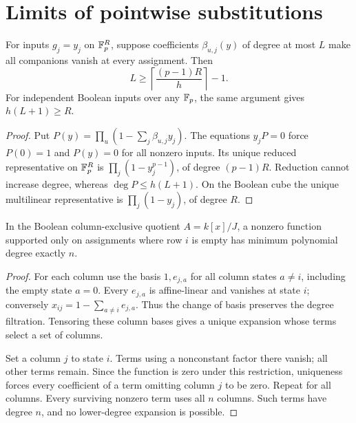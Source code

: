 \section{Limits of pointwise substitutions}
\begin{lemma}\label{lem:pointwisebarrier}
For inputs $g_j=y_j$ on $\mathbb F_p^R$, suppose coefficients $\beta_{u,j}(y)$ of degree at most $L$ make all companions vanish at every assignment. Then
\[
 \boxed{L\ge\left\lceil\frac{(p-1)R}{h}\right\rceil-1.}
\]
For independent Boolean inputs over any $\mathbb F_p$, the same argument gives $h(L+1)\ge R$.
\end{lemma}
\begin{proof}
Put $P(y)=\prod_u(1-\sum_j\beta_{u,j}y_j)$. The equations $y_jP=0$ force $P(0)=1$ and $P(y)=0$ for all nonzero inputs. Its unique reduced representative on $\mathbb F_p^R$ is $\prod_j(1-y_j^{p-1})$, of degree $(p-1)R$. Reduction cannot increase degree, whereas $\deg P\le h(L+1)$. On the Boolean cube the unique multilinear representative is $\prod_j(1-y_j)$, of degree $R$.
\end{proof}

\begin{lemma}\label{lem:emptyrowsupport}
In the Boolean column-exclusive quotient $A=k[x]/J$, a nonzero function supported only on assignments where row $i$ is empty has minimum polynomial degree exactly $n$.
\end{lemma}
\begin{proof}
For each column use the basis $1,e_{j,a}$ for all column states $a\ne i$, including the empty state $a=0$. Every $e_{j,a}$ is affine-linear and vanishes at state $i$; conversely $x_{ij}=1-\sum_{a\ne i}e_{j,a}$. Thus the change of basis preserves the degree filtration. Tensoring these column bases gives a unique expansion whose terms select a set of columns.

Set a column $j$ to state $i$. Terms using a nonconstant factor there vanish; all other terms remain. Since the function is zero under this restriction, uniqueness forces every coefficient of a term omitting column $j$ to be zero. Repeat for all columns. Every surviving nonzero term uses all $n$ columns. Such terms have degree $n$, and no lower-degree expansion is possible.
\end{proof}

